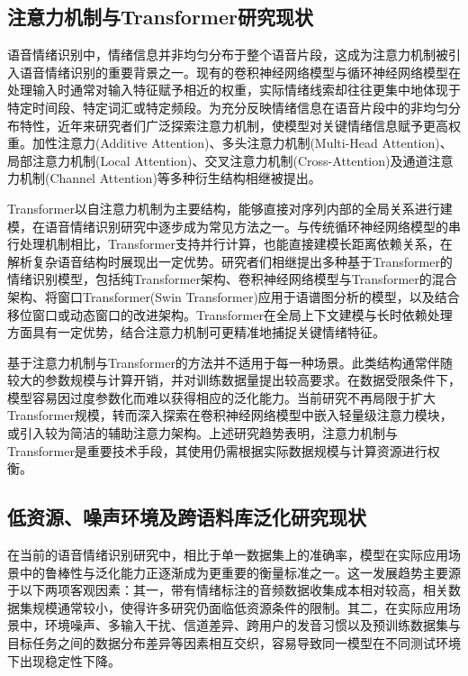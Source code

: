 \subsection{注意力机制与Transformer研究现状}

语音情绪识别中，情绪信息并非均匀分布于整个语音片段，这成为注意力机制被引入语音情绪识别的重要背景之一。现有的卷积神经网络模型与循环神经网络模型在处理输入时通常对输入特征赋予相近的权重，实际情绪线索却往往更集中地体现于特定时间段、特定词汇或特定频段\cite{liu2023dualrobustness,mao2022enhancing,peng2021efficient}。为充分反映情绪信息在语音片段中的非均匀分布特性，近年来研究者们广泛探索注意力机制，使模型对关键情绪信息赋予更高权重\cite{mirsamadi2017automatic,chen2023dwformer,wang2024swin}。加性注意力(Additive Attention)、多头注意力机制(Multi-Head Attention)、局部注意力机制(Local Attention)、交叉注意力机制(Cross-Attention)及通道注意力机制(Channel Attention)等多种衍生结构相继被提出\cite{hao2024channel,he2023multiple}。

Transformer以自注意力机制为主要结构，能够直接对序列内部的全局关系进行建模，在语音情绪识别研究中逐步成为常见方法之一\cite{liu2023dualrobustness,chen2023dwformer,wang2024swin}。与传统循环神经网络模型的串行处理机制相比，Transformer支持并行计算，也能直接建模长距离依赖关系，在解析复杂语音结构时展现出一定优势。研究者们相继提出多种基于Transformer的情绪识别模型，包括纯Transformer架构、卷积神经网络模型与Transformer的混合架构、将窗口Transformer(Swin Transformer)应用于语谱图分析的模型，以及结合移位窗口或动态窗口的改进架构。Transformer在全局上下文建模与长时依赖处理方面具有一定优势，结合注意力机制可更精准地捕捉关键情绪特征。

基于注意力机制与Transformer的方法并不适用于每一种场景。此类结构通常伴随较大的参数规模与计算开销，并对训练数据量提出较高要求。在数据受限条件下，模型容易因过度参数化而难以获得相应的泛化能力\cite{leem2024selective,prabhu2024end,ahn2025multitask}。当前研究不再局限于扩大Transformer规模，转而深入探索在卷积神经网络模型中嵌入轻量级注意力模块，或引入较为简洁的辅助注意力架构\cite{hao2024channel,chen2023dwformer,wang2024swin}。上述研究趋势表明，注意力机制与Transformer是重要技术手段，其使用仍需根据实际数据规模与计算资源进行权衡。

\subsection{低资源、噪声环境及跨语料库泛化研究现状}

在当前的语音情绪识别研究中，相比于单一数据集上的准确率，模型在实际应用场景中的鲁棒性与泛化能力正逐渐成为更重要的衡量标准之一。这一发展趋势主要源于以下两项客观因素：其一，带有情绪标注的音频数据收集成本相对较高，相关数据集规模通常较小，使得许多研究仍面临低资源条件的限制\cite{peng2021efficient,leem2024selective,sampath2025efficient}。其二，在实际应用场景中，环境噪声、多输入干扰、信道差异、跨用户的发音习惯以及预训练数据集与目标任务之间的数据分布差异等因素相互交织，容易导致同一模型在不同测试环境下出现稳定性下降\cite{su2023unsupervised,lu2022domain,gao2024adversarial}。

